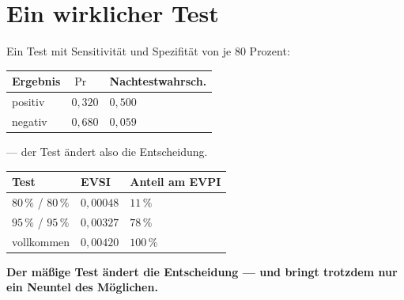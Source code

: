 \section{Ein wirklicher Test}

\begin{merksatz}
Ein Test mit Sensitivität und Spezifität von je $80$ Prozent:

\begin{center}
{\small
\renewcommand{\arraystretch}{1.48}
\begin{tabular}{@{}P{2.2cm}P{2.0cm}P{3.4cm}@{}}
\toprule
\textbf{Ergebnis} & $\Pr$ & \textbf{Nachtestwahrsch.}\\
\midrule
positiv & $0{,}320$ & $0{,}500$\\
negativ & $0{,}680$ & $0{,}059$\\
\bottomrule
\end{tabular}}
\end{center}

 --- der Test ändert also die Entscheidung.

\begin{center}
{\small
\renewcommand{\arraystretch}{1.5}
\begin{tabular}{@{}P{3.0cm}P{2.4cm}P{2.4cm}@{}}
\toprule
\textbf{Test} & \textbf{EVSI} & \textbf{Anteil am EVPI}\\
\midrule
$80\,\%$ / $80\,\%$ & $0{,}00048$ & $11\,\%$\\
$95\,\%$ / $95\,\%$ & $0{,}00327$ & $78\,\%$\\
vollkommen & $0{,}00420$ & $100\,\%$\\
\bottomrule
\end{tabular}}
\end{center}

\begin{center}
\begin{minipage}{0.9\textwidth}
\textbf{Der mäßige Test ändert die Entscheidung --- und bringt trotzdem nur ein Neuntel des Möglichen.}
\end{minipage}
\end{center}

\begin{center}
\begin{minipage}{0.88\textwidth}
\end{minipage}
\end{center}
\end{merksatz}

